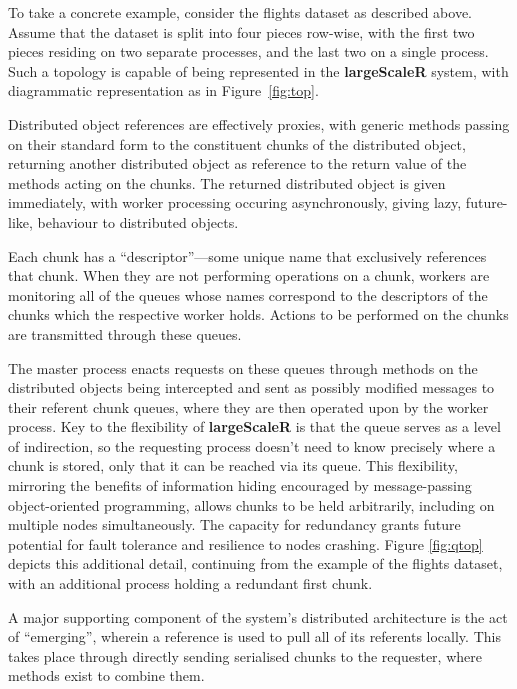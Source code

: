 To take a concrete example, consider the flights dataset as described above.
Assume that the dataset is split into four pieces row-wise, with the first two pieces residing on two separate processes, and the last two on a single process.
Such a topology is capable of being represented in the \textbf{largeScaleR} system, with diagrammatic representation as in Figure~\ref{fig:top}.



Distributed object references are effectively proxies, with generic methods passing on their standard form to the constituent chunks of the distributed object, returning another distributed object as reference to the return value of the methods acting on the chunks.
The returned distributed object is given immediately, with worker processing occuring asynchronously, giving lazy, future-like, behaviour to distributed objects\cite{baker1977incremental}.

Each chunk has a ``descriptor''---some unique name that exclusively references that chunk.
When they are not performing operations on a chunk, workers are monitoring all of the queues whose names correspond to the descriptors of the chunks which the respective worker holds.
Actions to be performed on the chunks are transmitted through these queues.

The master process enacts requests on these queues through methods on the distributed objects being intercepted and sent as possibly modified messages to their referent chunk queues, where they are then operated upon by the worker process.
Key to the flexibility of \textbf{largeScaleR} is that the queue serves as a level of indirection, so the requesting process doesn't need to know precisely where a chunk is stored, only that it can be reached via its queue.
This flexibility, mirroring the benefits of information hiding encouraged by message-passing object-oriented programming, allows chunks to be held arbitrarily, including on multiple nodes simultaneously.
The capacity for redundancy grants future potential for fault tolerance and resilience to nodes crashing.
Figure \ref{fig:qtop} depicts this additional detail, continuing from the example of the flights dataset, with an additional process holding a redundant first chunk.



A major supporting component of the system's distributed architecture is the act of ``emerging'', wherein a reference is used to pull all of its referents locally\cite{emmerich2000engineering}.
This takes place through directly sending serialised chunks to the requester, where methods exist to combine them.

